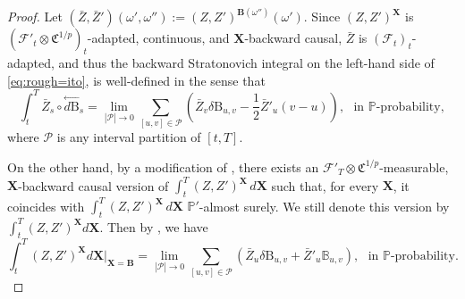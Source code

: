 \documentclass[11pt,reqno]{amsart}
\newcommand{\B}{{\mathbb{B}}}
\newcommand{\FC}{{\mathfrak{C}}}
\newcommand{\BX}{{\mathbf{X}}}
\newcommand{\BB}{{\mathbf{B}}}
\newcommand{\MF}{{\mathcal{F}}}
\newcommand{\MP}{{\mathcal{P}}}
\numberwithin{equation}{section}
\def\PP{{\mathbb P}}
\begin{document}
\begin{proof}
Let $(\bar Z, \bar Z')(\omega', \omega''):=(Z,Z')^{\BB(\omega'')}(\omega')$.
Since $(Z,Z')^{\BX}$ is $(\MF'_t \otimes \FC^{1/p})_t$-adapted, continuous, and $\BX$-backward causal, $\bar Z $ is $(\MF_t)_t$-adapted, and thus the backward Stratonovich integral on the left-hand side of \eqref{eq:rough=ito}, is well-defined in the sense that 
$$
\int_t^T \bar Z_s  \circ \overset{\leftarrow}{d \mathrm B}_s  = \lim_{|\MP| \rightarrow 0} \sum_{[u,v] \in \MP} \left(\bar Z_v \delta \mathrm B_{u,v}- \frac12 \bar Z'_u(v-u) \right), \ \ \ \text{in $\PP$-probability},
$$
where $\MP$ is any interval partition of $[t,T].$ 

On the other hand, by a modification of \cite[Theorem~3.4]{FLZ26-2}, there exists an $\MF'_T \otimes \FC^{1/p}$-measurable, $\BX$-backward causal version of $\int_t^T (Z,Z')^{\BX}\,d\BX$ such that, for every $\BX$, it coincides with $\int_t^T (Z,Z')^{\BX}\,d\BX$ $\PP'$-almost surely. We still denote this version  by $\int_t^T(Z,Z')^{\BX}d\BX$. Then by \cite[Corollary~8.7]{FLZ26}, we have 
$$
\int_t^T (Z,Z')^{\mathbf{X}  }d\BX \Big|_{\BX=\BB} = \lim_{|\MP| \rightarrow 0} \sum_{[u,v] \in \MP} (\bar Z_u \delta \mathrm B_{u,v}+ \bar Z'_u \B_{u,v} ), \ \ \ \text{in $\PP$-probability.}
$$



\end{proof}
\end{document}
